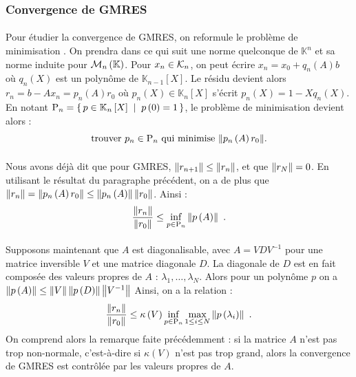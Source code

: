 		\subsubsection{Convergence de GMRES}

			\paragraph{}
			Pour étudier la convergence de GMRES, on reformule le problème de minimisation \cite{TrefethenBau1997}.
			On prendra dans ce qui suit une norme quelconque de $\mathbb{K}^n$ et sa norme induite pour $\mathcal{M}_{n}\left(\mathbb{K}\right)$.
			Pour $x_n\in\krylov{n}$, on peut écrire $x_n = x_0 + q_n\left(A\right)b$ où $q_n\left(X\right)$ est un polynôme de $\mathbb{K}_{n-1}\left[X\right]$.
			Le résidu devient alors $r_n = b - Ax_n = p_n\left(A\right)r_0$ où $p_n\left(X\right)\in\mathbb{K}_n\left[X\right]$ s'écrit $p_n\left(X\right) = 1 - Xq_n\left(X\right)$.
			En notant $\textup{P}_n = \left\{\,p\in\mathbb{K}_n\left[X\right]\;\mid\;p\left(0\right) = 1\,\right\}$, le problème de minimisation devient alors :
			\[\textrm{trouver $p_n\in \textup{P}_n$ qui minimise $\norm{p_n\left(A\right)r_0}$.}\]


			\paragraph{}
			Nous avons déjà dit que pour GMRES, $\norm{r_{n+1}}\leq\norm{r_n}$, et que $\norm{r_N} = 0$.
			En utilisant le résultat du paragraphe précédent, on a de plus que $\norm{r_n} = \norm{p_n\left(A\right)r_0}\leq\norm{p_n\left(A\right)}\norm{r_0}$. Ainsi :
			\[\frac{\norm{r_n}}{\norm{r_0}} \leq \inf_{p\in\textup{P}_n}\norm{p\left(A\right)}\ .\]

			\paragraph{}
			Supposons maintenant que $A$ est diagonalisable, avec $A = VDV^{-1}$ pour une matrice inversible $V$ et une matrice diagonale $D$.
			La diagonale de $D$ est en fait composée des valeurs propres de $A$ : $\lambda_1, \dots, \lambda_N$.
			Alors pour un polynôme $p$ on a $\norm{p\left(A\right)}\leq\norm{V}\norm{p\left(D\right)}\norm{V^{-1}}$
			Ainsi, on a la relation :
			\[\frac{\norm{r_n}}{\norm{r_0}} \leq \kappa\left(V\right)\inf_{p\in\textup{P}_n}\max_{1\leq i\leq N}\norm{p\left(\lambda_i\right)}\ .\]
			On comprend alors la remarque faite précédemment : si la matrice $A$ n'est pas trop non-normale, c'est-à-dire si $\kappa\left(V\right)$ n'est pas trop grand, alors la convergence de GMRES est contrôlée par les valeurs propres de $A$.


